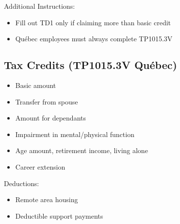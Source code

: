 \documentclass[letterpaper,10pt,english]{sphinxmanual}
\begin{document}
\sphinxAtStartPar
Additional Instructions:
\begin{itemize}
\item {} 
\sphinxAtStartPar
Fill out TD1 only if claiming more than basic credit

\item {} 
\sphinxAtStartPar
Québec employees must always complete TP\sphinxhyphen{}1015.3\sphinxhyphen{}V

\end{itemize}


\subsection{Tax Credits (TP\sphinxhyphen{}1015.3\sphinxhyphen{}V \sphinxhyphen{} Québec)}
\label{\detokenize{onboarding_employee:tax-credits-tp-1015-3-v-quebec}}\begin{itemize}
\item {} 
\sphinxAtStartPar
Basic amount

\item {} 
\sphinxAtStartPar
Transfer from spouse

\item {} 
\sphinxAtStartPar
Amount for dependants

\item {} 
\sphinxAtStartPar
Impairment in mental/physical function

\item {} 
\sphinxAtStartPar
Age amount, retirement income, living alone

\item {} 
\sphinxAtStartPar
Career extension

\end{itemize}

\sphinxAtStartPar
Deductions:
\begin{itemize}
\item {} 
\sphinxAtStartPar
Remote area housing

\item {} 
\sphinxAtStartPar
Deductible support payments

\end{itemize}
\end{document}
